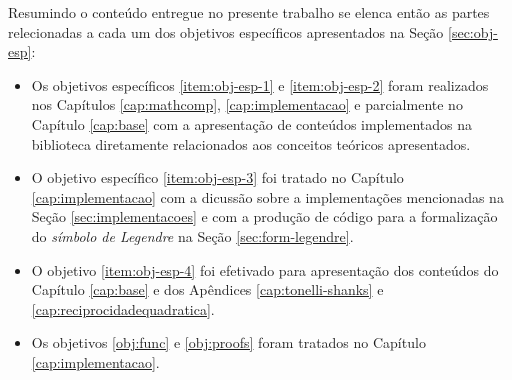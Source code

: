 Resumindo o conteúdo entregue no presente trabalho se elenca então as partes relecionadas a cada um dos objetivos específicos apresentados na Seção \ref{sec:obj-esp}: 
\begin{itemize}
    \item Os objetivos específicos \ref{item:obj-esp-1} e \ref{item:obj-esp-2} foram realizados nos Capítulos \ref{cap:mathcomp}, \ref{cap:implementacao} e parcialmente no Capítulo \ref{cap:base} com a apresentação de conteúdos implementados na biblioteca diretamente relacionados aos conceitos teóricos apresentados.  
    
    \item O objetivo específico \ref{item:obj-esp-3} foi tratado no Capítulo \ref{cap:implementacao} com a dicussão sobre a implementações mencionadas na Seção \ref{sec:implementacoes} e com a produção de código para a formalização do \textit{símbolo de Legendre} na Seção \ref{sec:form-legendre}.
    
    \item O objetivo \ref{item:obj-esp-4} foi efetivado para apresentação dos conteúdos do Capítulo \ref{cap:base} e dos Apêndices \ref{cap:tonelli-shanks} e \ref{cap:reciprocidadequadratica}.
    
    \item Os objetivos \ref{obj:func} e \ref{obj:proofs} foram tratados no Capítulo \ref{cap:implementacao}.
\end{itemize}

